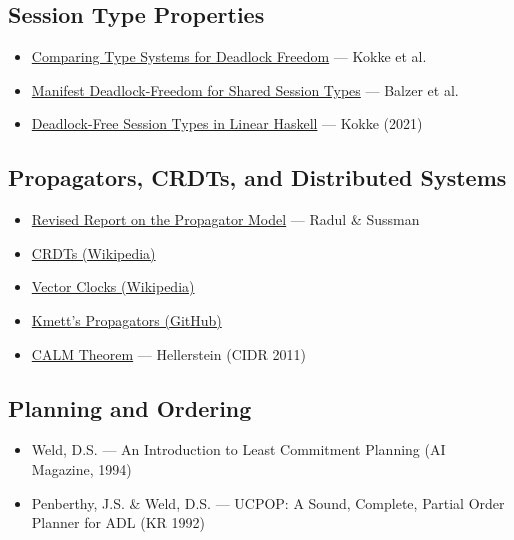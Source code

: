 \documentclass[11pt]{article}
\begin{document}
\subsection{Session Type Properties}
\label{sec:orgabcaaaf}
\begin{itemize}
\item \href{https://eprints.gla.ac.uk/262401/1/262401.pdf}{Comparing Type Systems for Deadlock Freedom} — Kokke et al.
\item \href{https://www.cs.cmu.edu/\~balzers/publications/manifest\_deadlock\_freedom.pdf}{Manifest Deadlock-Freedom for Shared Session Types} — Balzer et al.
\item \href{https://arxiv.org/pdf/2103.14481}{Deadlock-Free Session Types in Linear Haskell} — Kokke (2021)
\end{itemize}
\subsection{Propagators, CRDTs, and Distributed Systems}
\label{sec:org618dddb}
\begin{itemize}
\item \href{https://groups.csail.mit.edu/mac/users/gjs/propagators/}{Revised Report on the Propagator Model} — Radul \& Sussman
\item \href{https://en.wikipedia.org/wiki/Conflict-free\_replicated\_data\_type}{CRDTs (Wikipedia)}
\item \href{https://en.wikipedia.org/wiki/Vector\_clock}{Vector Clocks (Wikipedia)}
\item \href{https://github.com/ekmett/propagators}{Kmett's Propagators (GitHub)}
\item \href{https://dsf.berkeley.edu/papers/cidr11-bloom.pdf}{CALM Theorem} — Hellerstein (CIDR 2011)
\end{itemize}
\subsection{Planning and Ordering}
\label{sec:org936f7ac}
\begin{itemize}
\item Weld, D.S. — An Introduction to Least Commitment Planning (AI Magazine, 1994)
\item Penberthy, J.S. \& Weld, D.S. — UCPOP: A Sound, Complete, Partial Order Planner for ADL (KR 1992)
\end{itemize}
\end{document}
